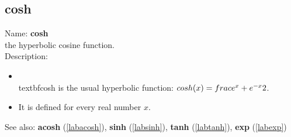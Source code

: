 \subsection{cosh}
\label{labcosh}
\noindent Name: \textbf{cosh}\\
the hyperbolic cosine function.\\
\noindent Description: \begin{itemize}

\item \\textbf{cosh} is the usual hyperbolic function: $\\cosh(x) = \\frac{e^x + e^{-x}}{2}$.\n
\item It is defined for every real number $x$.\n\end{itemize}
See also: \textbf{acosh} (\ref{labacosh}), \textbf{sinh} (\ref{labsinh}), \textbf{tanh} (\ref{labtanh}), \textbf{exp} (\ref{labexp})
